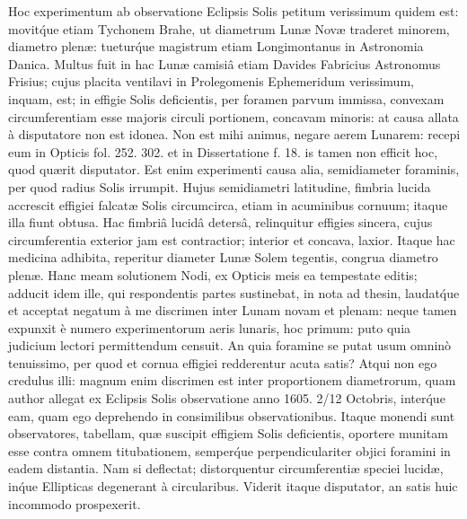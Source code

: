 \documentclass[a4paper, 11pt, oneside, polutonikogreek, german]{article}
\begin{document}
Hoc experimentum ab observatione Eclipsis Solis petitum verissimum quidem est: movit\'que etiam Tychonem Brahe, ut diametrum Lunæ Novæ traderet minorem, diametro plenæ: tuetur\'que magistrum etiam Longimontanus in Astronomia Danica. Multus fuit in hac Lunæ camisiâ etiam Davides Fabricius Astronomus Frisius; cujus placita ventilavi in Prolegomenis Ephemeridum verissimum, inquam, est; in effigie Solis deficientis, per foramen parvum immissa, convexam circumferentiam esse majoris circuli portionem, concavam minoris: at causa allata à disputatore non est idonea. Non est mihi animus, negare aerem Lunarem: recepi eum in Opticis fol. 252. 302. et in Dissertatione f. 18. is tamen non efficit hoc, quod quærit disputator. Est enim experimenti causa alia, semidiameter foraminis, per quod radius Solis irrumpit. Hujus semidiametri latitudine, fimbria lucida accrescit effigiei falcatæ Solis circumcirca, etiam in acuminibus cornuum; itaque illa fiunt obtusa. Hac fimbriâ lucidâ detersâ, relinquitur effigies sincera, cujus circumferentia exterior jam est contractior; interior et concava, laxior. Itaque hac medicina adhibita, reperitur diameter Lunæ Solem tegentis, congrua diametro plenæ.\hspace*{5mm}
Hanc meam solutionem Nodi, ex Opticis meis ea tempestate editis; adducit idem ille, qui respondentis partes sustinebat, in nota ad thesin, laudat\'que et acceptat negatum à me discrimen inter Lunam novam et plenam: neque tamen expunxit è numero experimentorum aeris lunaris, hoc primum: puto quia judicium lectori permittendum censuit. An quia foramine se putat usum omninò tenuissimo, per quod et cornua effigiei redderentur acuta satis? Atqui non ego credulus illi: magnum enim discrimen est inter proportionem diametrorum, quam author allegat ex Eclipsis Solis observatione anno 1605. 2/12 Octobris, inter\'que eam, quam ego deprehendo in consimilibus observationibus. Itaque monendi sunt observatores, tabellam, quæ suscipit effigiem Solis deficientis, oportere munitam esse contra omnem titubationem, semper\'que perpendiculariter objici foramini in eadem distantia. Nam si deflectat; distorquentur circumferentiæ speciei lucidæ, in\'que Ellipticas degenerant à circularibus. Viderit itaque disputator, an satis huic incommodo prospexerit.\hspace*{5mm}
\end{document}
